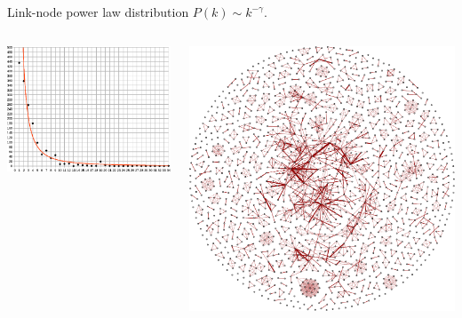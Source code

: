 \documentclass[handout, notes=hide]{beamer}
\begin{document}
\begin{frame}
Link-node power law distribution $P(k) \sim k^{-\gamma}$.
\begin{columns}[b]
\begin{column}[c]{0.5\textwidth}
\includegraphics[width=\textwidth]{powerlaw-netscience}
\end{column}
\begin{column}[c]{0.45\textwidth}
\includegraphics[width=\textwidth]{netscience}
\end{column}
\end{columns}
\end{frame}
\end{document}

